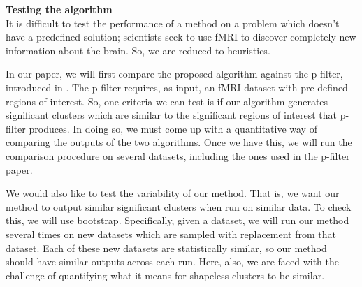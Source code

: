\documentclass[12pt]{article}
\begin{document}
{\bf Testing the algorithm } \\
It is difficult to test the performance of a method on a problem which doesn't have a predefined solution; scientists seek to use fMRI to discover
completely new information about the brain. So, we are reduced to heuristics. 

In our paper, we will first compare the proposed algorithm against the p-filter, introduced in \cite{foygel2015p}. 
The p-filter requires, as input, an fMRI dataset with pre-defined regions of interest. So, one criteria we can test is if our algorithm generates
significant clusters which are similar to the significant regions of interest that p-filter produces.  In doing so, we must come up with a quantitative way 
of comparing the outputs of the two algorithms. Once we have this, we will run the comparison procedure on several datasets,  including 
the ones used in the p-filter paper. 

We would also like to test the variability of our method. That is, we want our method to output 
similar significant clusters when run on similar data. To check this, we will use bootstrap. Specifically, given a dataset, we will run our method several times 
on new datasets which are sampled with replacement from that dataset.  Each of these new datasets are statistically similar, 
so our method should have similar outputs across each run. Here, also, we are faced with the challenge of quantifying what it means for shapeless clusters to be similar. 

 

\end{document}
